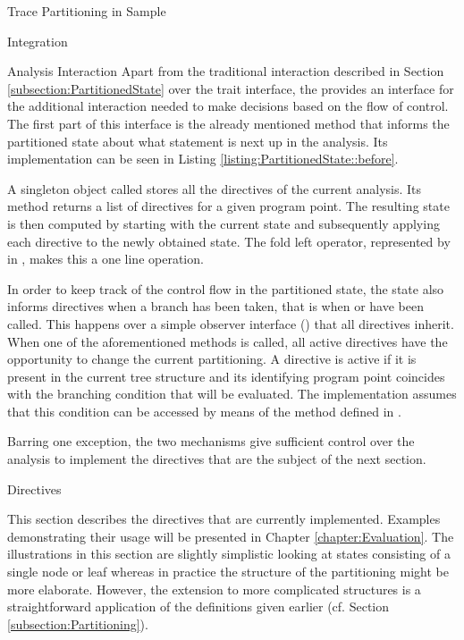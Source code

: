 \begin{chapter}{Trace Partitioning in Sample}
\begin{section}{Integration}
\begin{subsection}{Analysis Interaction}
			Apart from the traditional interaction described in Section \ref{subsection:PartitionedState} over the  trait interface, the  provides an interface for the additional interaction needed to make decisions based on the flow of control. The first part of this interface is the already mentioned  method that informs the partitioned state about what statement is next up in the analysis. Its implementation can be seen in Listing \ref{listing:PartitionedState::before}.

			

			A singleton object called  stores all the directives of the current analysis. Its  method returns a list of directives for a given program point. The resulting state is then computed by starting with the current state and subsequently applying each directive to the newly obtained state. The fold left operator, represented by \code{/:} in \scala, makes this a one line operation.

			In order to keep track of the control flow in the partitioned state, the state also informs directives when a branch has been taken, that is when  or  have been called. This happens over a simple observer interface () that all directives inherit. When one of the aforementioned methods is called, all active directives have the opportunity to change the current partitioning. A directive is active if it is present in the current tree structure and its identifying program point coincides with the branching condition that will be evaluated. The implementation assumes that this condition can be accessed by means of the  method defined in .
			
			Barring one exception, the two mechanisms give sufficient control over the analysis to implement the directives that are the subject of the next section.
		\end{subsection}
	\end{section}


	\begin{section}{Directives}
		\label{section:Directives}
		
		This section describes the directives that are currently implemented. Examples demonstrating their usage will be presented in Chapter \ref{chapter:Evaluation}. The illustrations in this section are slightly simplistic looking at states consisting of a single node or leaf whereas in practice the structure of the partitioning might be more elaborate. However, the extension to more complicated structures is a straightforward application of the definitions given earlier (cf. Section \ref{subsection:Partitioning}).


\end{section}
\end{chapter}
